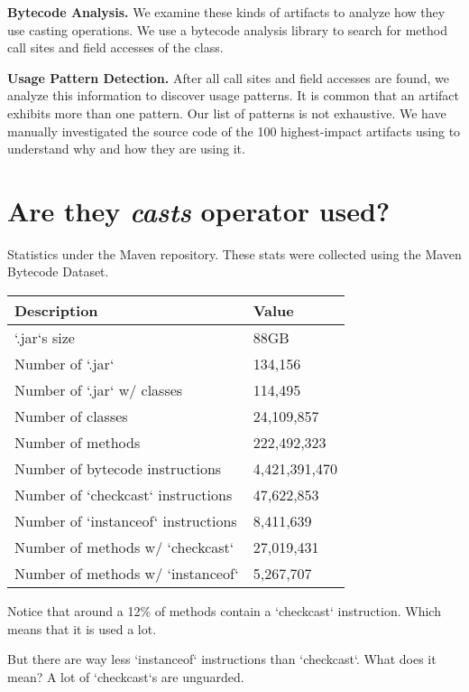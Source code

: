 \documentclass{usiinfdocprop}
\begin{document}
\textbf{Bytecode Analysis.} 
We examine these kinds of artifacts to analyze how they use casting operations. 
We use a bytecode analysis library to search for method call sites and field accesses of the \smu{} class. 

\textbf{Usage Pattern Detection.} 
After all call sites and field accesses are found, we analyze this information to discover usage patterns. 
It is common that an artifact exhibits more than one pattern. 
Our list of patterns is not exhaustive.  
We have manually investigated the source code of the 100 highest-impact artifacts using \smu{} to understand why and how they are using it. 

\section{Are they \emph{casts} operator used? \label{orgb0b4e0e}}
\label{sec:orgb1d0eea}

Statistics under the Maven repository. 
These stats were collected using the Maven Bytecode Dataset. 

\begin{center}
\begin{tabular}{ll}
Description & Value\\
\hline
`.jar`s size & 88GB\\
Number of `.jar` & 134,156\\
Number of `.jar` w/ classes & 114,495\\
Number of classes & 24,109,857\\
Number of methods & 222,492,323\\
Number of bytecode instructions & 4,421,391,470\\
Number of `checkcast` instructions & 47,622,853\\
Number of `instanceof` instructions & 8,411,639\\
Number of methods w/ `checkcast` & 27,019,431\\
Number of methods w/ `instanceof` & 5,267,707\\
\end{tabular}
\end{center}

Notice that around a 12\% of methods contain a `checkcast` instruction. 
Which means that it is used a lot. 

But there are way less `instanceof` instructions than `checkcast`. 
What does it mean? 
A lot of `checkcast`s are unguarded. 
\end{document}
